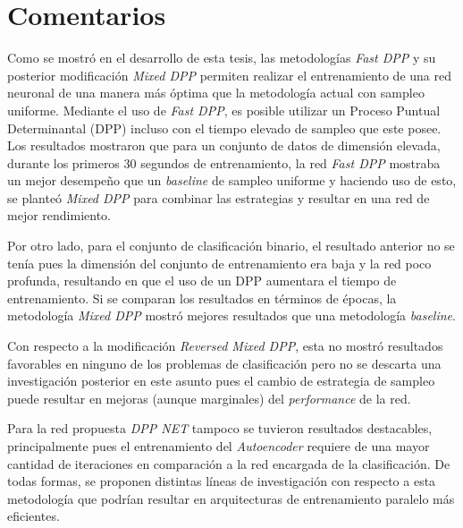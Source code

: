\section{Comentarios}

Como se mostró en el desarrollo de esta tesis, las metodologías \textit{Fast DPP} y su posterior modificación \textit{Mixed DPP} permiten realizar el entrenamiento de una red neuronal de una manera más óptima que la metodología actual con sampleo uniforme. Mediante el uso de \textit{Fast DPP}, es posible utilizar un Proceso Puntual Determinantal (DPP) incluso con el tiempo elevado de sampleo que este posee. Los resultados mostraron que para un conjunto de datos de dimensión elevada, durante los primeros 30 segundos de entrenamiento, la red \textit{Fast DPP} mostraba un mejor desempeño que un \textit{baseline} de sampleo uniforme y haciendo uso de esto, se planteó \textit{Mixed DPP} para combinar las estrategias y resultar en una red de mejor rendimiento. 

\vspace{0.2cm}

Por otro lado, para el conjunto de clasificación binario, el resultado anterior no se tenía pues la dimensión del conjunto de entrenamiento era baja y la red poco profunda, resultando en que el uso de un DPP aumentara el tiempo de entrenamiento. Si se comparan los resultados en términos de épocas, la metodología \textit{Mixed DPP} mostró mejores resultados que una metodología \textit{baseline}.

\vspace{0.2cm}

Con respecto a la modificación \textit{Reversed Mixed DPP}, esta no mostró resultados favorables en ninguno de los problemas de clasificación pero no se descarta una investigación posterior en este asunto pues el cambio de estrategia de sampleo puede resultar en mejoras (aunque marginales) del \textit{performance} de la red. 

\vspace{0.2cm}

Para la red propuesta \textit{DPP NET} tampoco se tuvieron resultados destacables, principalmente pues el entrenamiento del \textit{Autoencoder} requiere de una mayor cantidad de iteraciones en comparación a la red encargada de la clasificación. De todas formas, se proponen distintas líneas de investigación con respecto a esta metodología que podrían resultar en arquitecturas de entrenamiento paralelo más eficientes. 

\vspace{0.2cm}

